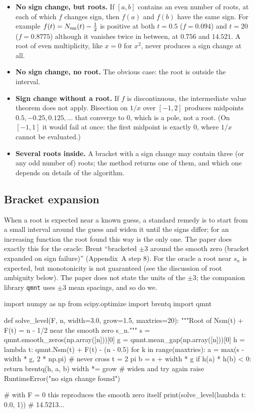 \begin{itemize}
\item \textbf{No sign change, but roots.} If $[a,b]$ contains an even number of roots, at each of which $f$ changes sign, then $f(a)$ and $f(b)$ have the same sign. For example $f(t)=N_{\mathrm{sm}}(t)-\tfrac12$ is positive at both $t=0.5$ ($f=0.094$) and $t=20$ ($f=0.8775$) although it vanishes twice in between, at $0.756$ and $14.521$. A root of even multiplicity, like $x=0$ for $x^2$, never produces a sign change at all.
\item \textbf{No sign change, no root.} The obvious case: the root is outside the interval.
\item \textbf{Sign change without a root.} If $f$ is discontinuous, the intermediate value theorem does not apply. Bisection on $1/x$ over $[-1,2]$ produces midpoints $0.5,-0.25,0.125,\dots$ that converge to $0$, which is a pole, not a root. (On $[-1,1]$ it would fail at once: the first midpoint is exactly $0$, where $1/x$ cannot be evaluated.)
\item \textbf{Several roots inside.} A bracket with a sign change may contain three (or any odd number of) roots; the method returns one of them, and which one depends on details of the algorithm.
\end{itemize}

\subsection{Bracket expansion}

When a root is expected near a known guess, a standard remedy is to start from a small interval around the guess and widen it until the signs differ; for an increasing function the root found this way is the only one. The paper does exactly this for the oracle: Brent ``bracketed $\pm3$ around the smooth zero (bracket expanded on sign failure)'' (Appendix~A step 8). For the oracle a root near $s_n$ is expected, but monotonicity is not guaranteed (see the discussion of root ambiguity below). The paper does not state the units of the $\pm3$; the companion library \texttt{qmnt} uses $\pm3$ mean spacings, and so do we.

\begin{pycode}
import numpy as np
from scipy.optimize import brentq
import qmnt

def solve_level(F, n, width=3.0, grow=1.5, maxtries=20):
    """Root of Nsm(t) + F(t) = n - 1/2 near the smooth zero s_n."""
    s = qmnt.smooth_zeros(np.array([n]))[0]
    g = qmnt.mean_gap(np.array([n]))[0]
    h = lambda t: qmnt.Nsm(t) + F(t) - (n - 0.5)
    for k in range(maxtries):
        a = max(s - width * g, 2 * np.pi)   # never cross t = 2 pi
        b = s + width * g
        if h(a) * h(b) < 0:
            return brentq(h, a, b)
        width *= grow                      # widen and try again
    raise RuntimeError("no sign change found")

# with F = 0 this reproduces the smooth zero itself
print(solve_level(lambda t: 0.0, 1))       # 14.5213...
\end{pycode}

